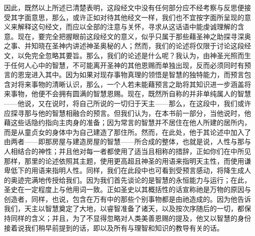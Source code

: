 因此，既然以上所述已清楚表明，这段经文中没有任何部分应不经考察与反思便接受其字面意思，那么，或许正如对待其他经文一样，我们也不宜按字面所呈现的意义来解释这句经文，而应以全部的注意与关怀，寻求从这话语中能虔诚理解的含意。现在，要完全把握眼前这段经文的意义，似乎只属于那些藉圣神之助探寻深奥之事、并知晓在圣神内讲述神圣奥秘的人；然而，我们的论述将仅限于讨论这段经文，以免完全忽略其要旨。那么，我们的论述是什么呢？我认为，由神圣光照而生于任何人心中的智慧，不可能离开圣神的其他恩赐而单独出现，反而必须同时有预言的恩宠进入其中。因为如果对现存事物真理的领悟是智慧的独特能力，而预言包含对将来事物的清晰认识，那么，一个人若未能藉预言之助将其知识进一步涵盖将来事物，他便不会拥有圆满的智慧恩赐。现在，既然所自称的并非单纯属人的智慧——他说，又在说时，将自己所说的一切归于天主——那么，在这段中，我们或许应探寻那与他的智慧相融合的预言。但我们认为，在本书前一部分，当他说时，他藉这些话隐约指向主肉身的准备；因为常言的智慧并不居住在他人所建的居所内，而是从童贞女的身体中为自己建造了那住所。然而，在此处，他于其论述中加入了由两者——即那房屋与建造房屋的智慧——所合成的整体，也就是说，人性与那与人相结合的神性；并且他对每一者都使用了适当且相称的措辞，正如你们在中所见那样，那里的论述依照其主题，使用更高超且神圣的用语来指明天主性，而使用谦卑低下的用语来指明人性。同样，我们在此段中也可看到受预言感动，将降生成人的奥迹完满地传授给我们。因为我们首先谈论的是智慧的永恒能力与运行；在此，圣史在一定程度上与他用词一致。正如圣史以其概括性的话宣称祂是万物的原因与创造者，同样，也说，包含在万有中的那些个别事物都是由祂造成的。因为他告诉我们，天主以智慧奠定了大地，以睿智准备了诸天，以及按次序随后的一切，都保持同样的含义；并且，为了不显得忽略对人类美善恩赐的提及，他又以智慧的身份接着说我们稍早前提到的话，即以及所有与理智和知识的教导有关的话。\par

